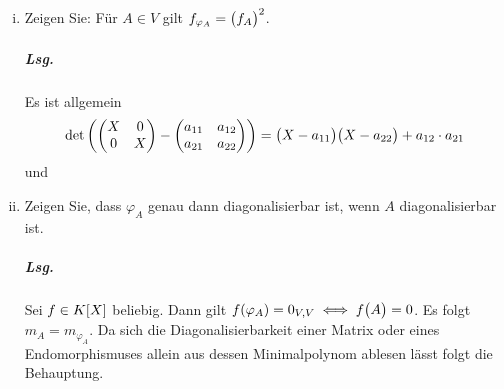 \documentclass{scrreprt}
\newcommand{\Mat}{\text{Mat}}
\begin{document}
\begin{enumerate}[(i)]
\item Zeigen Sie: Für $A \in V$ gilt $f_{\varphi_A} = \qty\big(f_A)^2$.
  \subparagraph{Lsg.} Es ist allgemein
  \[
    \det\qty(
    \begin{pmatrix}
      X & 0 \\
      0 & X \\
    \end{pmatrix} - \begin{pmatrix}
      a_{11} & a_{12} \\
      a_{21} & a_{22} \\
    \end{pmatrix}
    ) = \qty\big(X - a_{11})\qty\big(X - a_{22}) + a_{12} \cdot a_{21}
  \]
  und
\item Zeigen Sie, dass $\varphi_A$ genau dann diagonalisierbar ist, wenn $A$
  diagonalisierbar ist.

  \subparagraph{Lsg.} Sei $f \in K\qty[X]$ beliebig.
  Dann gilt $f\qty(\varphi_A) = 0_{V,V} \iff f\qty\big(A) = 0$.
  Es folgt $m_A = m_{\varphi_A}$.
  Da sich die Diagonalisierbarkeit einer Matrix oder eines Endomorphismuses
  allein aus dessen Minimalpolynom ablesen lässt folgt die Behauptung.
\end{enumerate}
\end{document}
